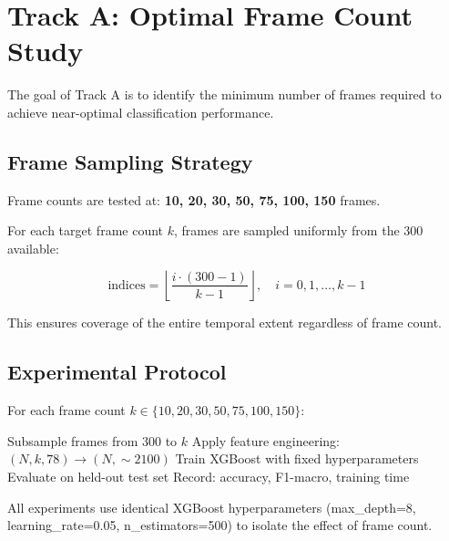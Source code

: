 \documentclass[11pt,a4paper]{article}
\begin{document}
\section{Track A: Optimal Frame Count Study}\label{sec:track-a}

The goal of Track A is to identify the minimum number of frames required to achieve near-optimal classification performance.

\subsection{Frame Sampling Strategy}

Frame counts are tested at: \textbf{10, 20, 30, 50, 75, 100, 150} frames.

For each target frame count $k$, frames are sampled uniformly from the 300 available:

\begin{equation}
  \text{indices} = \left\lfloor \frac{i \cdot (300 - 1)}{k - 1} \right\rfloor, \quad i = 0, 1, \ldots, k-1
\end{equation}

This ensures coverage of the entire temporal extent regardless of frame count.

\subsection{Experimental Protocol}

For each frame count $k \in \{10, 20, 30, 50, 75, 100, 150\}$:

\begin{algorithm}[H]
  \caption{Track A Experimental Protocol}
  \begin{algorithmic}[1]
    \State Subsample frames from 300 to $k$
    \State Apply feature engineering: $(N, k, 78) \rightarrow (N, \sim 2100)$
    \State Train XGBoost with fixed hyperparameters
    \State Evaluate on held-out test set
    \State Record: accuracy, F1-macro, training time
  \end{algorithmic}
\end{algorithm}

All experiments use identical XGBoost hyperparameters (max\_depth=8, learning\_rate=0.05, n\_estimators=500) to isolate the effect of frame count.
\end{document}
